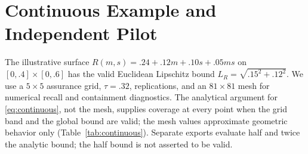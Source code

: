 \documentclass[twoside,11pt]{article}
\begin{document}
\begin{table}[ht]
\centering\small
\caption{Paired mean ARR gain of the multiplier over each comparator in the sensitivity study.
MCSE uses paired replication differences. These efficiency comparisons must be read together
with the coverage results.}
\label{tab:gains}
\end{table}
\begin{table}[ht]
\centering\small\setlength{\tabcolsep}{4pt}
\caption{Validity in the power study of Section~\ref{sec:power}: minimum band coverage over the
24 cells of each family size, the minimum at $n=250$, minimum containment at $\tau=.10$, and
maximum UCP. Exact Holm supplies fixed-tolerance tests and has no band.}
\label{tab:power-validity}
\end{table}
\begin{table}[ht]
\centering\small\setlength{\tabcolsep}{4pt}
\caption{Exact one-sided failure probability of the studentized normal upper bound
$\widehat R_k+z_{1-\alpha/K}\widehat\sigma_k/\sqrt n$ for one environment with risk $R_k$, as a
multiple of its nominal value $\alpha/K$ ($\alpha=.05$). Values are computed from the binomial
distribution without simulation; a value of 1 would indicate exact calibration.}
\label{tab:tail}
\end{table}
\begin{table}[ht]
\centering\small
\caption{Equally spaced WDBC logistic-regression grids.}
\label{tab:grid}
\end{table}
\FloatBarrier

\section{Continuous Example and Independent Pilot}
\label{app:continuous}
The illustrative surface $R(m,s)=.24+.12m+.10s+.05ms$ on $[0,.4]\times[0,.6]$ has the valid
Euclidean Lipschitz bound $L_R=\sqrt{.15^2+.12^2}$. We use a $5\times5$ assurance grid,
$\tau=.32$, \ContReps{} replications, and an $81\times81$ mesh for numerical recall and
containment diagnostics. The analytical argument for \eqref{eq:continuous}, not the mesh,
supplies coverage at every point when the grid band and the global bound are valid; the mesh
values approximate geometric behavior only (Table~\ref{tab:continuous}). Separate exports
evaluate half and twice the analytic bound; the half bound is not asserted to be valid.
\end{document}
